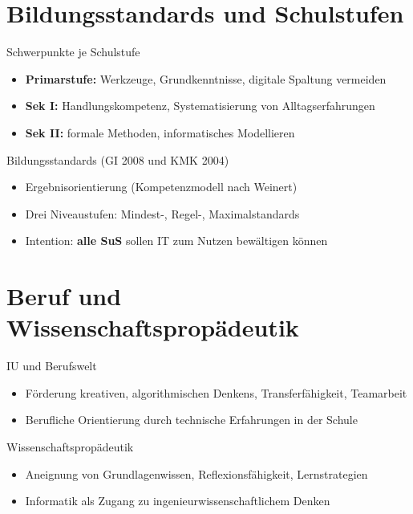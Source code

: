 \documentclass{article}
\begin{document}
\section{Bildungsstandards und Schulstufen}

\begin{block}{Schwerpunkte je Schulstufe}
    \begin{itemize}
        \item \textbf{Primarstufe:} Werkzeuge, Grundkenntnisse, digitale Spaltung vermeiden
        \item \textbf{Sek I:} Handlungskompetenz, Systematisierung von Alltagserfahrungen
        \item \textbf{Sek II:} formale Methoden, informatisches Modellieren
    \end{itemize}
\end{block}

\begin{block}{Bildungsstandards (GI 2008 und KMK 2004)}
    \begin{itemize}
        \item Ergebnisorientierung (Kompetenzmodell nach Weinert)
        \item Drei Niveaustufen: Mindest-, Regel-, Maximalstandards
        \item Intention: \textbf{alle SuS} sollen IT zum Nutzen bewältigen können
    \end{itemize}
\end{block}

\section{Beruf und Wissenschaftspropädeutik}

\begin{block}{IU und Berufswelt}
    \begin{itemize}
        \item Förderung kreativen, algorithmischen Denkens, Transferfähigkeit, Teamarbeit
        \item Berufliche Orientierung durch technische Erfahrungen in der Schule
    \end{itemize}
\end{block}

\begin{block}{Wissenschaftspropädeutik}
    \begin{itemize}
        \item Aneignung von Grundlagenwissen, Reflexionsfähigkeit, Lernstrategien
        \item Informatik als Zugang zu ingenieurwissenschaftlichem Denken
    \end{itemize}
\end{block}
\end{document}
